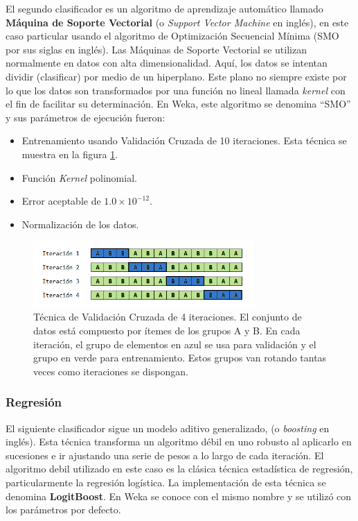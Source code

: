 El segundo clasificador es un algoritmo de aprendizaje automático llamado \textbf{Máquina de Soporte Vectorial} (o \textit{Support Vector Machine} en inglés), en este caso particular usando el algoritmo de Optimización Secuencial Mínima\cite{Platt1999} (SMO por sus siglas en inglés).
Las Máquinas de Soporte Vectorial se utilizan normalmente en datos con alta dimensionalidad. Aquí, los datos se intentan dividir (clasificar) por medio de un hiperplano. Este plano no siempre existe por lo que los datos son transformados por una función no lineal llamada \textit{kernel} con el fin de facilitar su determinación.
En Weka, este algoritmo se denomina ``SMO'' y sus parámetros de ejecución fueron:
\begin{itemize}
    \item Entrenamiento usando Validación Cruzada de 10 iteraciones. Esta técnica se muestra en la figura \ref{fig:cross-validation}.
    \item Función \textit{Kernel} polinomial.
    \item Error aceptable de $1.0 \times 10^{-12}$.
    \item Normalización de los datos.
\end{itemize}

\begin{figure}
    \centering
    \includegraphics[width=0.75\textwidth]{images/cross-validation.png}
    \caption{Técnica de Validación Cruzada de 4 iteraciones. El conjunto de datos está compuesto por ítemes de los grupos A y B. En cada iteración, el grupo de elementos en azul se usa para validación y el grupo en verde para entrenamiento. Estos grupos van rotando tantas veces como iteraciones se dispongan.}
    \label{fig:cross-validation}
\end{figure}


\subsubsection{Regresión}

El siguiente clasificador sigue un modelo aditivo generalizado, (o \emph{boosting} en inglés). 
Esta técnica transforma un algoritmo débil en uno robusto al aplicarlo en sucesiones e ir ajustando una serie de pesos a lo largo de cada iteración. 
El algoritmo debil utilizado en este caso es la clásica técnica estadística de regresión, particularmente la regresión logística. La implementación de esta técnica se denomina \textbf{LogitBoost}\cite{Friedman2000}. En Weka se conoce con el mismo nombre y se utilizó con los parámetros por defecto.


